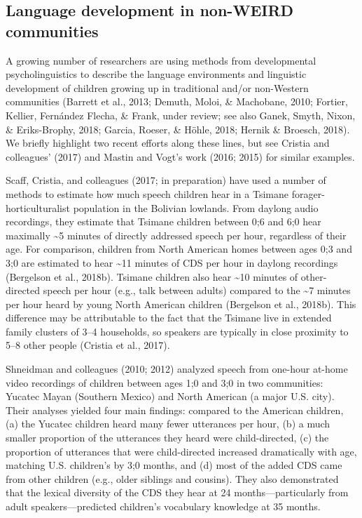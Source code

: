 \documentclass[floatsintext,man]{apa6}
\theoremstyle{definition}
\theoremstyle{definition}
\theoremstyle{definition}
\theoremstyle{remark}
\begin{document}
\subsection{Language development in non-WEIRD
communities}\label{intro-nonweird}

A growing number of researchers are using methods from developmental
psycholinguistics to describe the language environments and linguistic
development of children growing up in traditional and/or non-Western
communities (Barrett et al., 2013; Demuth, Moloi, \& Machobane, 2010;
Fortier, Kellier, Fernández Flecha, \& Frank, under review; see also
Ganek, Smyth, Nixon, \& Eriks-Brophy, 2018; Garcia, Roeser, \& Höhle,
2018; Hernik \& Broesch, 2018). We briefly highlight two recent efforts
along these lines, but see Cristia and colleagues' (2017) and Mastin and
Vogt's work (2016; 2015) for similar examples.

Scaff, Cristia, and colleagues (2017; in preparation) have used a number
of methods to estimate how much speech children hear in a Tsimane
forager-horticulturalist population in the Bolivian lowlands. From
daylong audio recordings, they estimate that Tsimane children between
0;6 and 6;0 hear maximally \textasciitilde{}5 minutes of directly
addressed speech per hour, regardless of their age. For comparison,
children from North American homes between ages 0;3 and 3;0 are
estimated to hear \textasciitilde{}11 minutes of CDS per hour in daylong
recordings (Bergelson et al., 2018b). Tsimane children also hear
\textasciitilde{}10 minutes of other-directed speech per hour (e.g.,
talk between adults) compared to the \textasciitilde{}7 minutes per hour
heard by young North American children (Bergelson et al., 2018b). This
difference may be attributable to the fact that the Tsimane live in
extended family clusters of 3--4 households, so speakers are typically
in close proximity to 5--8 other people (Cristia et al., 2017).

Shneidman and colleagues (2010; 2012) analyzed speech from one-hour
at-home video recordings of children between ages 1;0 and 3;0 in two
communities: Yucatec Mayan (Southern Mexico) and North American (a major
U.S. city). Their analyses yielded four main findings: compared to the
American children, (a) the Yucatec children heard many fewer utterances
per hour, (b) a much smaller proportion of the utterances they heard
were child-directed, (c) the proportion of utterances that were
child-directed increased dramatically with age, matching U.S. children's
by 3;0 months, and (d) most of the added CDS came from other children
(e.g., older siblings and cousins). They also demonstrated that the
lexical diversity of the CDS they hear at 24 months---particularly from
adult speakers---predicted children's vocabulary knowledge at 35 months.
\end{document}
